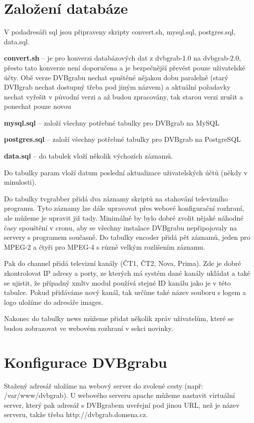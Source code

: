 \section{Založení databáze}

V podadresáři sql jsou připraveny skripty convert.sh, mysql.sql, postgres.sql, data.sql.
\bitem
\item\textbf{convert.sh} -- je pro konverzi databázových dat z dvbgrab-1.0 na dvbgrab-2.0, přesto tato konverze není doporučena a je bezpečnější převést pouze uživatelské účty. Obě verze DVBgrabu nechat spuštěné nějakou dobu paralelně (starý DVBgrab nechat dostupný třeba pod jiným názvem) a aktuální požadavky nechat vyřešit v původní verzi a až budou zpracovány, tak starou verzi zrušit a ponechat pouze novou
\item\textbf{mysql.sql} -- založí všechny potřebné tabulky pro DVBgrab na MySQL
\item\textbf{postgres.sql} -- založí všechny potřebné tabulky pro DVBgrab na PostgreSQL
\item\textbf{data.sql} -- do tabulek vloží několik výchozích záznamů. 
\eitem

Do tabulky param vloží datum poslední aktualizace uživatelských účtů (někdy v minulosti). 

Do tabulky tvgrabber přidá dva záznamy skriptů na stahování televizního programu. Tyto záznamy lze dále upravovat přes webové konfigurační rozhraní, ale můžeme je upravit již tady. Minimálně by bylo dobré zvolit nějaké náhodné časy spouštění v cronu, aby se všechny instalace DVBgrabu nepřipojovaly na servery s programem současně. Do tabulky encoder přidá pět záznamů, jeden pro MPEG-2 a čtyři pro MPEG-4 s různě velkým rozlišením záznamu. 

Pak do channel přidá televizní kanály (ČT1, ČT2, Nova, Prima). Zde je dobré zkontrolovat IP adresy a porty, ze kterých má systém dané kanály ukládat a také se ujistit, že případný xmltv modul používá stejné ID kanálu jako je v této tabulce. Pokud přidáváme nový kanál, tak určíme také název souboru s logem a logo uložíme do adresáře images.

Nakonec do tabulky news můžeme přidat několik zpráv uživatelům, které se budou zobrazovat ve webovém rozhraní v sekci novinky.

\section{Konfigurace DVBgrabu}

Stažený adresář uložíme na webový server do zvolené cesty (např: /var/www/dvbgrab). U webového serveru apache můžeme nastavit virtuální server, který pak adresář s DVBgrabem uveřejní pod jinou URL, než je název serveru, takže třeba http://dvbgrab.domena.cz.

